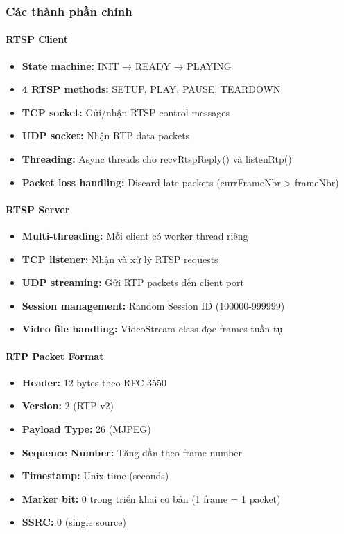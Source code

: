 \documentclass[a4paper,12pt]{article}
\begin{document}
\subsubsection{Các thành phần chính}

\paragraph{RTSP Client}
\begin{itemize}
    \item \textbf{State machine:} INIT → READY → PLAYING
    \item \textbf{4 RTSP methods:} SETUP, PLAY, PAUSE, TEARDOWN
    \item \textbf{TCP socket:} Gửi/nhận RTSP control messages
    \item \textbf{UDP socket:} Nhận RTP data packets
    \item \textbf{Threading:} Async threads cho recvRtspReply() và listenRtp()
    \item \textbf{Packet loss handling:} Discard late packets (currFrameNbr > frameNbr)
\end{itemize}

\paragraph{RTSP Server}
\begin{itemize}
    \item \textbf{Multi-threading:} Mỗi client có worker thread riêng
    \item \textbf{TCP listener:} Nhận và xử lý RTSP requests
    \item \textbf{UDP streaming:} Gửi RTP packets đến client port
    \item \textbf{Session management:} Random Session ID (100000-999999)
    \item \textbf{Video file handling:} VideoStream class đọc frames tuần tự
\end{itemize}

\paragraph{RTP Packet Format}
\begin{itemize}
    \item \textbf{Header:} 12 bytes theo RFC 3550
    \item \textbf{Version:} 2 (RTP v2)
    \item \textbf{Payload Type:} 26 (MJPEG)
    \item \textbf{Sequence Number:} Tăng dần theo frame number
    \item \textbf{Timestamp:} Unix time (seconds)
    \item \textbf{Marker bit:} 0 trong triển khai cơ bản (1 frame = 1 packet)
    \item \textbf{SSRC:} 0 (single source)
\end{itemize}
\end{document}
